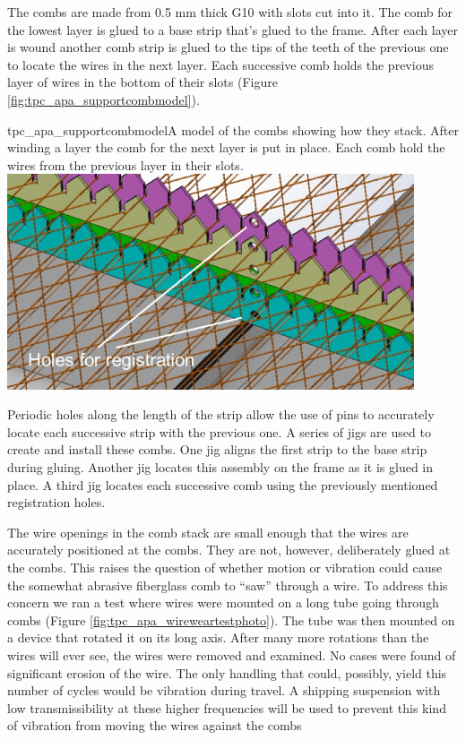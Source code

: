 The combs are made from 0.5 mm thick G10 with slots cut into it.  The comb for the lowest layer is glued to a base strip that's glued to the frame.  After each layer is wound another comb strip is glued to the tips of the teeth of the previous one to locate the wires in the next layer.  Each successive comb holds the previous layer of wires in the bottom of their slots (Figure \ref{fig:tpc_apa_supportcombmodel}).

\begin{cdrfigure}{tpc_apa_supportcombmodel}{A model of the combs showing how they stack.  After winding a layer the comb for the next layer is put in place.  Each comb hold the wires from the previous layer in their slots.}
\includegraphics[width=0.9\textwidth]{figures/tpc_apa_supportcombmodel.png} 
\end{cdrfigure}

Periodic holes along the length of the strip allow the use of pins to accurately locate each successive strip with the previous one.  A series of jigs are used to create and install these combs.  One jig aligns the first strip to the base strip during gluing.  Another jig locates this assembly on the frame as it is glued in place. A third jig locates each successive comb using the previously mentioned registration holes.

The wire openings in the comb stack are small enough that the wires are accurately positioned at the combs.  They are not, however, deliberately glued at the combs.  This raises the question of whether motion or vibration could cause the somewhat abrasive fiberglass comb to ``saw'' through a wire.  To address this concern we ran a test where wires were mounted on a long tube going through combs (Figure \ref{fig:tpc_apa_wireweartestphoto}).  The tube was then mounted on a device that rotated it on its long axis.  After many more rotations than the wires will ever see, the wires were removed and examined.  No cases were found of significant erosion of the wire.  The only handling that could, possibly, yield this number of cycles would be vibration during travel.  A shipping suspension with low transmissibility at these higher frequencies will be used to prevent this kind of vibration from moving the wires against the combs

